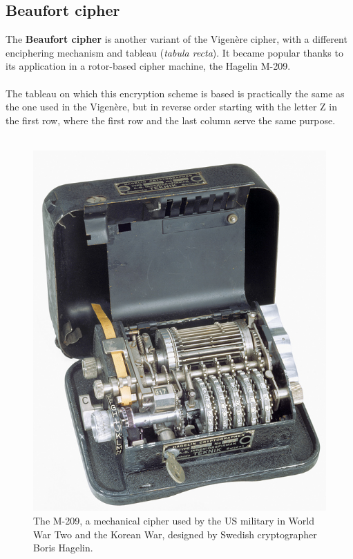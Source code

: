 \documentclass[Lau,binding=0.6cm,oneside]{sapthesis}
\begin{document}
\subsection{Beaufort cipher}
The \textbf{Beaufort cipher} is another variant of the Vigenère cipher, with a different enciphering mechanism and tableau (\textit{tabula recta}). It became popular thanks to its application in a rotor-based cipher machine, the Hagelin M-209.\\\\
The tableau on which this encryption scheme is based is practically the same as the one used in the Vigenère, but in reverse order starting with the letter \textsf{Z} in the first row, where the first row and the last column serve the same purpose.\\\\

\begin{figure}[H]
\includegraphics[scale=0.27]{m-209}
\captionsetup{justification=centering, margin=0.6cm}
\centering
\caption{The M-209, a mechanical cipher used by the US military in World War Two and the Korean War, designed by Swedish cryptographer Boris Hagelin.}
\centering
\end{figure}
\end{document}
